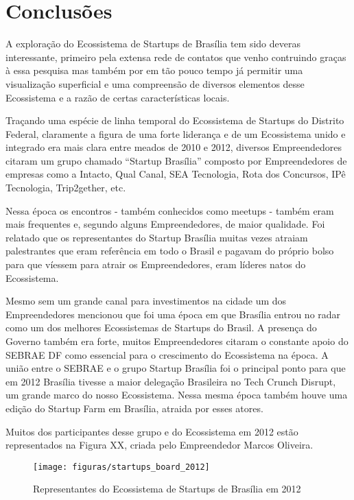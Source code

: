 \chapter[Conclusões Pré-Eliminares]{Conclusões}
\label{cap-conclusoes}

A exploração do Ecossistema de Startups de Brasília tem sido deveras interessante, primeiro pela extensa rede de contatos que venho contruindo graças à essa pesquisa mas também por em tão pouco tempo já permitir uma visualização superficial e uma compreensão de diversos elementos desse Ecossistema e a razão de certas características locais.

Traçando uma espécie de linha temporal do Ecossistema de Startups do Distrito Federal, claramente a figura de uma forte liderança e de um Ecossistema unido e integrado era mais clara entre meados de 2010 e 2012, diversos Empreendedores citaram um grupo chamado ``Startup Brasília'' composto por Empreendedores de empresas como a Intacto, Qual Canal, SEA Tecnologia, Rota dos Concursos, IPê Tecnologia, Trip2gether, etc. 

Nessa época os encontros - também conhecidos como meetups - também eram mais frequentes e, segundo alguns Empreendedores, de maior qualidade. Foi relatado que os representantes do Startup Brasília muitas vezes atraiam palestrantes que eram referência em todo o Brasil e pagavam do próprio bolso para que víessem para atrair os Empreendedores, eram líderes natos do Ecossistema.

Mesmo sem um grande canal para investimentos na cidade um dos Empreendedores mencionou que foi uma época em que Brasília entrou no radar como um dos melhores Ecossistemas de Startups do Brasil. A presença do Governo também era forte, muitos Empreendedores citaram o constante apoio do SEBRAE DF como essencial para o crescimento do Ecossistema na época. A união entre o SEBRAE e o grupo Startup Brasília foi o principal ponto para que em 2012 Brasília tivesse a maior delegação Brasileira no Tech Crunch Disrupt, um grande marco do nosso Ecossistema. Nessa mesma época também houve uma edição do Startup Farm em Brasília, atraida por esses atores.

Muitos dos participantes desse grupo e do Ecossistema em 2012 estão representados na Figura XX, criada pelo Empreendedor Marcos Oliveira.

\begin{figure}[!htb]
	\centering
	\texttt{[image: figuras/startups\_board\_2012]}
	\caption{Representantes do Ecossistema de Startups de Brasília em 2012}
	\label{figure:startups_board_2012}
\end{figure}

